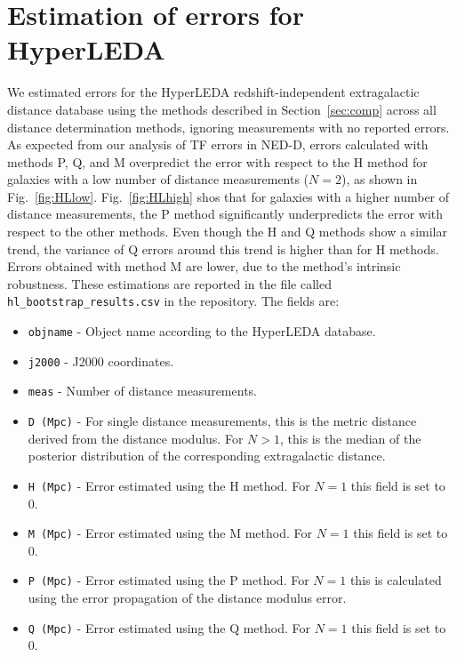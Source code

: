 \documentclass[a4paper,fleqn,usenatbib]{mnras}
\begin{document}
\section{Estimation of errors for HyperLEDA}
We estimated errors for the HyperLEDA redshift-independent extragalactic distance database using the methods described in Section~\ref{sec:comp} across all distance determination methods, ignoring measurements with no reported errors. As expected from our analysis of TF errors in NED-D, errors calculated with methods P, Q, and M overpredict the error with respect to the H method for galaxies with a low number of distance measurements ($N=2$), as shown in Fig.~\ref{fig:HLlow}. Fig.~\ref{fig:HLhigh} shos that for galaxies with a higher number of distance measurements, the P method significantly underpredicts the error with respect to the other methods. Even though the H and Q methods show a similar trend, the variance of Q errors around this trend is higher than for H methods. Errors obtained with method M are lower, due to the method's intrinsic robustness. These estimations are reported in the file called \texttt{hl\_bootstrap\_results.csv} in the repository. The fields are:
\begin{itemize}
\item \texttt{objname} - Object name according to the HyperLEDA database.
\item \texttt{j2000} - J2000 coordinates.
\item \texttt{meas} - Number of distance measurements.
\item \texttt{D (Mpc)} - For single distance measurements, this is the metric distance derived from the distance modulus. For $N>1$, this is the median of the posterior distribution of the corresponding extragalactic distance.
\item \texttt{H (Mpc)} - Error estimated using the H method. For $N=1$ this field is set to 0.
\item \texttt{M (Mpc)} - Error estimated using the M method. For $N=1$ this field is set to 0.
\item \texttt{P (Mpc)} - Error estimated using the P method. For $N=1$ this is calculated using the error propagation of the distance modulus error.
\item \texttt{Q (Mpc)} - Error estimated using the Q method. For $N=1$ this field is set to 0.
\end{itemize}
\end{document}
